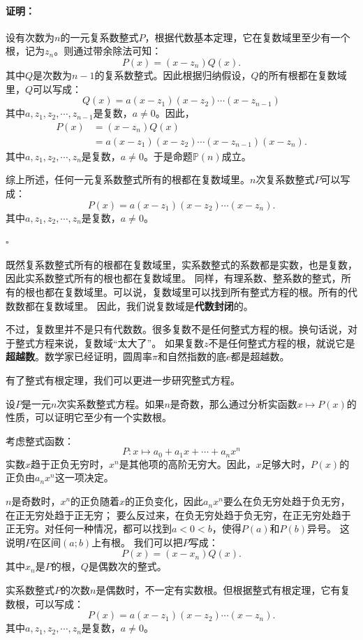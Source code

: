 \documentclass[12pt,UTF8]{ctexbook}
\theoremstyle{definition}
\theoremstyle{plain}
\renewenvironment{proof}{\paragraph{\textbf{证明：}}}{\hfill$\square$}
\begin{document}
\begin{appendix}
\begin{proof}
    设有次数为$n$的一元复系数整式$P$，根据代数基本定理，它在复数域里至少有一个根，记为$z_n$。则通过带余除法可知：
    $$ P(x) = (x - z_n)Q(x).$$
    其中$Q$是次数为$n-1$的复系数整式。因此根据归纳假设，$Q$的所有根都在复数域里，$Q$可以写成：
    $$ Q(x) = a(x - z_1)(x - z_2)\cdots(x - z_{n-1})$$
    其中$a, z_1, z_2,\cdots, z_{n-1}$是复数，$a\neq 0$。因此，
    \begin{align*} 
        P(x) &= (x - z_n)Q(x) \\
        &= a(x - z_1)(x - z_2)\cdots(x - z_{n-1})(x - z_n).
    \end{align*}
    其中$a, z_1, z_2,\cdots, z_n$是复数，$a\neq 0$。于是命题$\mathbb{P}(n)$成立。

    综上所述，任何一元复系数整式所有的根都在复数域里。$n$次复系数整式$P$可以写成：
    $$ P(x) = a(x - z_1)(x - z_2)\cdots(x - z_n).$$
    其中$a, z_1, z_2,\cdots, z_n$是复数，$a\neq 0$。 

\end{proof}

既然复系数整式所有的根都在复数域里，实系数整式的系数都是实数，也是复数，因此实系数整式所有的根也都在复数域里。
同样，有理系数、整系数的整式，所有的根也都在复数域里。可以说，复数域里可以找到所有整式方程的根。所有的代数数都在复数域里。
因此，我们说复数域是\textbf{代数封闭}的。

不过，复数里并不是只有代数数。很多复数不是任何整式方程的根。换句话说，对于整式方程来说，复数域“太大了”。
如果复数$z$不是任何整式方程的根，就说它是\textbf{超越数}。数学家已经证明，圆周率$\pi$和自然指数的底$e$都是超越数。

有了整式有根定理，我们可以更进一步研究整式方程。

设$P$是一元$n$次实系数整式方程。如果$n$是奇数，那么通过分析实函数$x\mapsto P(x)$的性质，可以证明它至少有一个实数根。

考虑整式函数：
$$P: x\mapsto a_0 + a_1 x + \cdots + a_n x^n$$
实数$x$趋于正负无穷时，$x^n$是其他项的高阶无穷大。因此，$x$足够大时，$P(x)$的正负由$a_nx^n$这一项决定。

$n$是奇数时，$x^n$的正负随着$x$的正负变化，因此$a_nx^n$要么在负无穷处趋于负无穷，在正无穷处趋于正无穷；
要么反过来，在负无穷处趋于负无穷，在正无穷处趋于正无穷。对任何一种情况，都可以找到$a<0<b$，使得$P(a)$和$P(b)$异号。
这说明$P$在区间$(a;b)$上有根。
我们可以把$P$写成：
$$ P(x) = (x - x_n)Q(x).$$
其中$x_n$是$P$的根，$Q$是偶数次的整式。

实系数整式$P$的次数$n$是偶数时，不一定有实数根。但根据整式有根定理，它有复数根，可以写成：
$$ P(x) = a(x - z_1)(x - z_2)\cdots(x - z_n).$$
其中$a, z_1, z_2,\cdots, z_n$是复数，$a\neq 0$。


\end{appendix}
\end{document}
